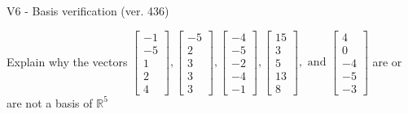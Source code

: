 \begin{exercise}
  \begin{exerciseTitle}V6 - Basis verification (ver. 436)\end{exerciseTitle}
  \begin{exerciseStatement}
    Explain why the vectors \(\left[\begin{array}{r}
-1 \\
-5 \\
1 \\
2 \\
4
\end{array}\right] , \left[\begin{array}{r}
-5 \\
2 \\
3 \\
3 \\
3
\end{array}\right] , \left[\begin{array}{r}
-4 \\
-5 \\
-2 \\
-4 \\
-1
\end{array}\right] , \left[\begin{array}{r}
15 \\
3 \\
5 \\
13 \\
8
\end{array}\right] , \text{ and } \left[\begin{array}{r}
4 \\
0 \\
-4 \\
-5 \\
-3
\end{array}\right]\) are or are not a basis of \(\mathbb{R}^5\)	



\end{exerciseStatement}
\end{exercise}
